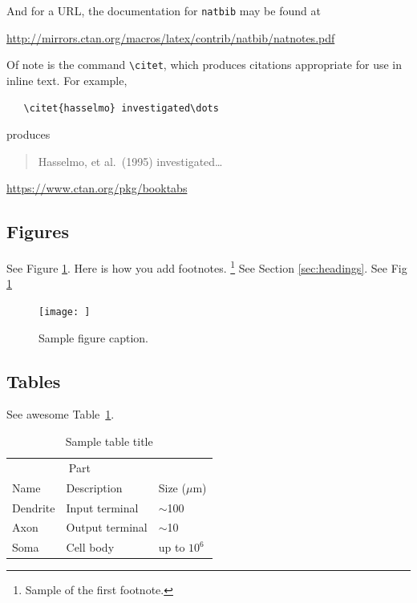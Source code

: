 \documentclass{article}
\begin{document}
And for a URL, the documentation for \verb+natbib+ may be found at
\begin{center}
  \url{http://mirrors.ctan.org/macros/latex/contrib/natbib/natnotes.pdf}
\end{center}
Of note is the command \verb+\citet+, which produces citations
appropriate for use in inline text.  For example, 
\begin{verbatim}
   \citet{hasselmo} investigated\dots
\end{verbatim}
produces
\begin{quote}
  Hasselmo, et al.\ (1995) investigated\dots
\end{quote}

\begin{center}
  \url{https://www.ctan.org/pkg/booktabs}
\end{center}


\subsection{Figures}
See Figure \ref{fig:fig1}. Here is how you add footnotes. \footnote{Sample of the first footnote.}
See Section \ref{sec:headings}.
See Fig \ref{fig:fig1}

\begin{figure}
  \centering
  \texttt{[image: ]}
  \caption{Sample figure caption.}
  \label{fig:fig1}
\end{figure}


\subsection{Tables}

See awesome Table~\ref{tab:table}.

\begin{table}
 \caption{Sample table title}
  \centering
  \begin{tabular}{lll}
    \toprule
    \multicolumn{2}{c}{Part}                   \\
    \cmidrule(r){1-2}
    Name     & Description     & Size ($\mu$m) \\
    \midrule
    Dendrite & Input terminal  & $\sim$100     \\
    Axon     & Output terminal & $\sim$10      \\
    Soma     & Cell body       & up to $10^6$  \\
    \bottomrule
  \end{tabular}
  \label{tab:table}
\end{table}




\end{document}
